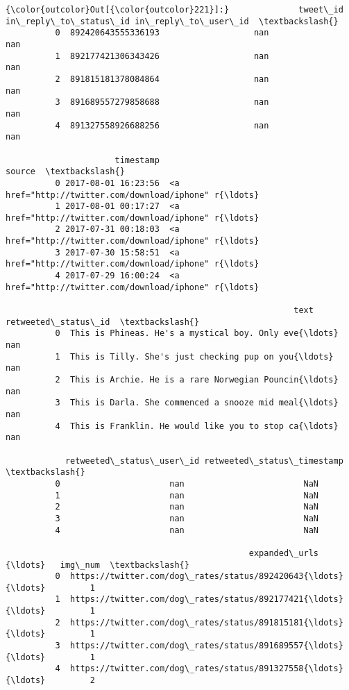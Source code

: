 \documentclass[11pt]{article}
\begin{document}
\begin{Verbatim}[commandchars=\\\{\}]
{\color{outcolor}Out[{\color{outcolor}221}]:}              tweet\_id in\_reply\_to\_status\_id in\_reply\_to\_user\_id  \textbackslash{}
          0  892420643555336193                   nan                 nan   
          1  892177421306343426                   nan                 nan   
          2  891815181378084864                   nan                 nan   
          3  891689557279858688                   nan                 nan   
          4  891327558926688256                   nan                 nan   
          
                      timestamp                                             source  \textbackslash{}
          0 2017-08-01 16:23:56  <a href="http://twitter.com/download/iphone" r{\ldots}   
          1 2017-08-01 00:17:27  <a href="http://twitter.com/download/iphone" r{\ldots}   
          2 2017-07-31 00:18:03  <a href="http://twitter.com/download/iphone" r{\ldots}   
          3 2017-07-30 15:58:51  <a href="http://twitter.com/download/iphone" r{\ldots}   
          4 2017-07-29 16:00:24  <a href="http://twitter.com/download/iphone" r{\ldots}   
          
                                                          text retweeted\_status\_id  \textbackslash{}
          0  This is Phineas. He's a mystical boy. Only eve{\ldots}                 nan   
          1  This is Tilly. She's just checking pup on you{\ldots}                 nan   
          2  This is Archie. He is a rare Norwegian Pouncin{\ldots}                 nan   
          3  This is Darla. She commenced a snooze mid meal{\ldots}                 nan   
          4  This is Franklin. He would like you to stop ca{\ldots}                 nan   
          
            retweeted\_status\_user\_id retweeted\_status\_timestamp  \textbackslash{}
          0                      nan                        NaN   
          1                      nan                        NaN   
          2                      nan                        NaN   
          3                      nan                        NaN   
          4                      nan                        NaN   
          
                                                 expanded\_urls  {\ldots}   img\_num  \textbackslash{}
          0  https://twitter.com/dog\_rates/status/892420643{\ldots}  {\ldots}         1   
          1  https://twitter.com/dog\_rates/status/892177421{\ldots}  {\ldots}         1   
          2  https://twitter.com/dog\_rates/status/891815181{\ldots}  {\ldots}         1   
          3  https://twitter.com/dog\_rates/status/891689557{\ldots}  {\ldots}         1   
          4  https://twitter.com/dog\_rates/status/891327558{\ldots}  {\ldots}         2   
          

\end{Verbatim}
\end{document}
